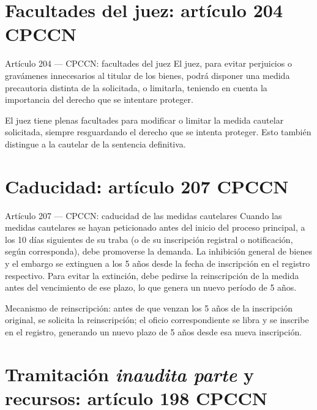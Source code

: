 \documentclass[12pt,oneside]{book}
\begin{document}
\section{Facultades del juez: artículo 204 CPCCN}

\begin{normativa}{Artículo 204 --- CPCCN: facultades del juez}
El juez, para evitar perjuicios o gravámenes innecesarios al titular de los bienes, podrá disponer una medida precautoria distinta de la solicitada, o limitarla, teniendo en cuenta la importancia del derecho que se intentare proteger.
\end{normativa}

El juez tiene plenas facultades para modificar o limitar la medida cautelar solicitada, siempre resguardando el derecho que se intenta proteger. Esto también distingue a la cautelar de la sentencia definitiva.

\section{Caducidad: artículo 207 CPCCN}

\begin{normativa}{Artículo 207 --- CPCCN: caducidad de las medidas cautelares}
Cuando las medidas cautelares se hayan peticionado antes del inicio del proceso principal, a los 10 días siguientes de su traba (o de su inscripción registral o notificación, según corresponda), debe promoverse la demanda. La inhibición general de bienes y el embargo se extinguen a los 5 años desde la fecha de inscripción en el registro respectivo. Para evitar la extinción, debe pedirse la reinscripción de la medida antes del vencimiento de ese plazo, lo que genera un nuevo período de 5 años.
\end{normativa}

Mecanismo de reinscripción: antes de que venzan los 5 años de la inscripción original, se solicita la reinscripción; el oficio correspondiente se libra y se inscribe en el registro, generando un nuevo plazo de 5 años desde esa nueva inscripción.

\section{Tramitación \textit{inaudita parte} y recursos: artículo 198 CPCCN}
\end{document}
